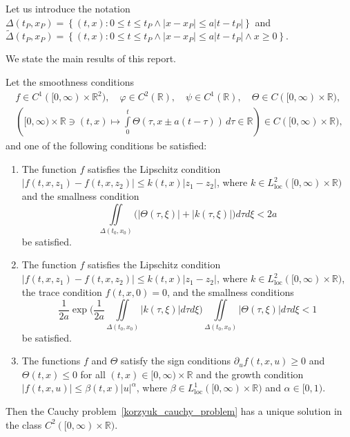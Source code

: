 \documentclass[12pt]{llncs}
\begin{document}
Let us introduce the notation
$
\Delta( {{t}_{P}},{{x}_{P}})=\left\{ \left( t,x \right) : 0 \leq t \leq {{t}_{P}}\wedge | x-{{x}_{P}} |\leq a| t-{{t}_{P}} | \right\}
$
and
$
\widetilde{\Delta}( {{t}_{P}},{{x}_{P}})=\left\{ \left( t,x \right) : 0 \leq t \leq {{t}_{P}}\wedge | x-{{x}_{P}} |\leq a| t-{{t}_{P}} | \wedge x \geq 0 \right\}\!.
$

We state the main results of this report.

\begin{theorem}\label{korzyuk_theo_cau_solve_cl} Let the smoothness conditions
  \begin{equation*}
      \begin{gathered}
          f\in C^1([0, \infty) \times \mathbb{R}^2), \quad \varphi \in C^2(\mathbb{R}), \quad \psi \in C^1(\mathbb{R}), \quad \Theta \in C([0, \infty) \times \mathbb{R}), \\
          \left([0, \infty) \times \mathbb{R} \ni (t,x)\mapsto \int\limits_{0}^{t}{\Theta ( \tau ,x\pm a( t-\tau  ))\, d\tau }\in \mathbb{R} \right)\in C([0, \infty) \times \mathbb{R}),
      \end{gathered}
  \end{equation*}
  and one of the following conditions be satisfied:
  \begin{enumerate}
      \item The function $f$ satisfies the Lipschitz condition $|f(t, x, z_1) - f(t, x, z_2)| \leq k(t, x)|z_1 - z_2|$, where $k \in L^2_\mathrm{loc}([0, \infty) \times \mathbb{R})$ and the smallness condition
      $$
      \iint\limits_{\Delta ( {{t}_{0}},{{x}_{0}} )} \big(|\Theta(\tau, \xi)| + |k(\tau, \xi)|\big) d\tau d\xi < 2 a
      $$
      be satisfied.
      \item The function $f$ satisfies the Lipschitz condition $|f(t, x, z_1) - f(t, x, z_2)| \leq k(t, x)|z_1 - z_2|$, where $k \in L^2_\mathrm{loc}([0, \infty) \times \mathbb{R})$, the trace condition $f(t, x, 0) = 0$, and the smallness conditions
      $$
        \frac{1}{2 a} \exp\!\bigg(\frac{1}{2 a}\iint\limits_{\Delta ( {{t}_{0}},{{x}_{0}} )} |k(\tau, \xi)| d\tau d\xi \bigg) \iint\limits_{\Delta ( {{t}_{0}},{{x}_{0}} )} |\Theta(\tau, \xi)| d\tau d\xi < 1
      $$
      be satisfied.
      \item The functions $f$ and $\Theta$ satisfy the sign conditions $\partial_u f(t, x, u) \geq 0$ and $\Theta(t,x) \leq 0$ for all $(t,x) \in [0, \infty) \times \mathbb{R}$ and the growth condition $|f(t,x,u)| \leq \beta(t,x) |u|^\alpha$, where $\beta \in L^1_\mathrm{loc}([0, \infty) \times \mathbb{R})$ and $\alpha \in [0, 1)$.
  \end{enumerate}
\noindent Then the Cauchy problem~\eqref{korzyuk_cauchy_problem} has a unique solution in the class $C^2([0, \infty) \times \mathbb{R})$.
\end{theorem}
\end{document}
